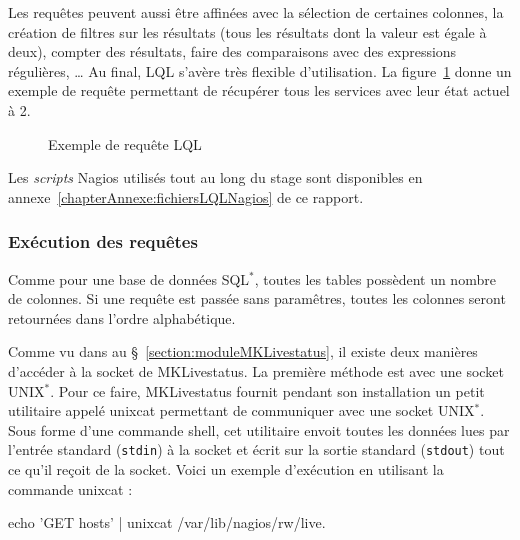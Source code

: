 \vspace{0.20cm}

Les requ\^etes peuvent aussi \^etre affin\'ees avec la s\'election de certaines colonnes, la cr\'eation de filtres sur les r\'esultats (tous les r\'esultats dont la valeur est \'egale \`a deux), compter des r\'esultats, faire des comparaisons avec des expressions r\'eguli\`eres, \ldots{}
Au final, LQL s'av\`ere tr\`es flexible d'utilisation.
La figure~\ref{code:exempleLQL} donne un exemple de requ\^ete permettant de r\'ecup\'erer tous les services avec leur \'etat actuel \`a 2.

\clearpage

\begin{figure}[!ht]
	
	\caption{Exemple de requ\^ete LQL}
	\label{code:exempleLQL}

\end{figure}

Les \textit{scripts} Nagios utilis\'es tout au long du stage sont disponibles en annexe~\ref{chapterAnnexe:fichiersLQLNagios} de ce rapport.

\subsubsection{Ex\'ecution des requ\^etes}

Comme pour une base de donn\'ees SQL$^*$, toutes les tables poss\`edent un nombre de colonnes.
Si une requ\^ete est pass\'ee sans param\^etres, toutes les colonnes seront retourn\'ees dans l'ordre alphab\'etique.

Comme vu dans au \S~\ref{section:moduleMKLivestatus}, il existe deux mani\`eres d'acc\'eder \`a la socket de MKLivestatus.
La premi\`ere m\'ethode est avec une socket UNIX$^*$. 
Pour ce faire, MKLivestatus fournit pendant son installation un petit utilitaire appel\'e \textsf{unixcat} permettant de communiquer avec une socket UNIX$^*$.
Sous forme d'une commande shell, cet utilitaire envoit toutes les donn\'ees lues par l'entr\'ee standard (\texttt{stdin}) \`a la socket et \'ecrit sur la sortie standard (\texttt{stdout}) tout ce qu'il re\c{c}oit de la socket.
Voici un exemple d'ex\'ecution en utilisant la commande \textsf{unixcat} : 

\begin{center}
	\textsf{echo 'GET hosts' | unixcat /var/lib/nagios/rw/live}.

\end{center}

